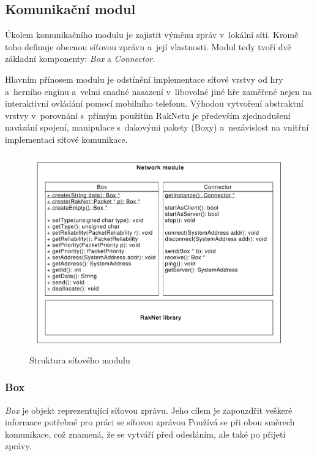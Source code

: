 \documentclass[thesis=B,czech,hidelinks]{FITthesis}[2012/06/26] %
\begin{document}
\subsection{Komunikační modul}

Úkolem komunikačního modulu je zajistit výměnu zpráv v~lokální síti. Kromě toho definuje obecnou síťovou zprávu a~její vlastnosti. Modul tedy tvoří dvě základní komponenty: \textit{Box} a \textit{Connector}. 

Hlavním přínosem modulu je odstínění implementace síťové vrstvy od hry a~herního enginu a~velmi snadné nasazení v~libovolné jiné hře zaměřené nejen na interaktivní ovládání pomocí mobilního telefonu. Výhodou vytvoření abstraktní vrstvy v~porovnání s~přímým použitím RakNetu je především zjednodušení navázání spojení, manipulace s~dakovými pakety (Boxy) a~nezávislost na vnitřní implementaci síťové komunikace.

\begin{figure}[h]
\includegraphics[width=\textwidth]{box_connector}
\caption{Struktura síťového modulu}
\end{figure}


\subsubsection{Box}

\textit{Box} je objekt reprezentující síťovou zprávu. Jeho cílem je zapouzdřit veškeré informace potřebné pro práci se síťovou zprávou Používá se při obou směrech komunikace, což znamená, že se vytváří před odesláním, ale také po přijetí zprávy.
\end{document}
